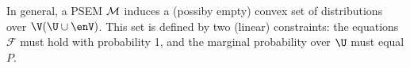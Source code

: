 In general, a PSEM $\cal M$
induces a (possiby empty) convex set of distributions over $\V(\U \cup \enV)$.
This set is defined by two (linear) constraints:
    the equations $\mathcal F$ must hold with probability 1, 
    and
    the marginal probability over $\U$ must
    equal $P$. 
